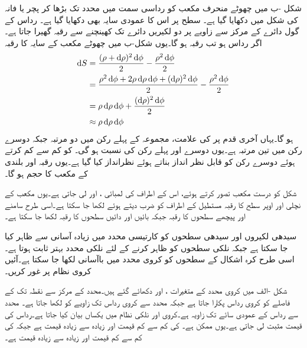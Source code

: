شکل -ب میں چھوٹے منحرف مکعب کو رداسی سمت میں  محدد تک بڑھا کر پچر یا فانہ کی شکل میں دکھایا گیا ہے۔ سطح پر اس کا عمودی سایہ بھی دکھایا گیا ہے۔ رداس کے گول دائرے  کے مرکز سے   زاویے پر دو لکیریں دائرے تک کھینچنے سے   رقبہ گھیرا جاتا ہے۔اگر رداس  ہو تب رقبہ  ہو گا۔یوں شکل-ب میں چھوٹے مکعب کے سایہ  کا رقبہ 
\begin{align*}
\dif S&=\frac{(\rho+\dif \rho)^2 \dif \phi}{2} - \frac{\rho^2 \dif \phi}{2}\\
&=\frac{\rho^2 \dif \phi +2 \rho \dif \rho \dif \phi+(\dif \rho)^2 \dif \phi}{2}-\frac{\rho^2 \dif \phi}{2}\\
&=\rho \dif \rho \dif \phi+\frac{(\dif \rho)^2 \dif \phi}{2}\\
&\approx \rho \dif \rho \dif \phi
\end{align*}
ہو گا۔یہاں آخری قدم پر  کی علامت، مجموعہ کے پہلے رکن میں دو مرتبہ  جبکہ دوسرے رکن میں تین مرتبہ ہے۔یوں دوسرے اور پہلے رکن کی نسبت
   ہو گی۔ کو کم سے کم کرتے ہوئے دوسرے رکن کو قابل نظر انداز بناتے ہوئے نظرانداز کیا گیا ہے۔یوں  رقبہ اور  بلندی کے مکعب کا حجم  ہو گا۔

شکل  کو درست مکعب تصور کرتے ہوئے، اس کے اطراف کی لمبائی ،  اور  لی جاتی ہے۔یوں مکعب کے نچلی اور اوپر سطح کا رقبہ مستطیل کے اطراف کو ضرب دیتے ہوئے   لکھا جا سکتا ہے۔اسی طرح سامنے اور پیچھے سطحوں  کا رقبہ  جبکہ بائیں اور دائیں سطحوں کا رقبہ  لکھا جا سکتا ہے۔

سیدھی لکیروں اور سیدھی سطحوں کو کارتیسی محدد میں زیادہ آسانی سے ظاہر کیا جا سکتا ہے جبکہ نلکی سطحوں کو ظاہر کرنے کے لئے نلکی محدد بہتر ثابت ہوتا ہے۔اسی طرح کرہ اشکال کے سطحوں کو کروی محدد میں باآسانی لکھا جا سکتا ہے۔آئیں کروی نظام پر غور کریں۔

شکل -الف میں کروی محدد کے متغیرات ،  اور  دکھائے گئے ہیں۔محدد کے مرکز سے نقطہ  تک کے فاصلے  کو کروی رداس پکارا جاتا ہے جبکہ  محدد سے کروی رداس تک زاویے کو  لکھا جاتا ہے۔ محدد سے رداس کے عمودی سائے تک زاویہ  ہے۔کروی اور نلکی نظام میں  یکساں بیان کیا جاتا ہے۔رداس کی  قیمت مثبت لی جاتی ہے۔یوں  ممکن ہے۔ کی کم سے کم قیمت  اور  زیادہ سے زیادہ  قیمت  ہے جبکہ  کی کم سے کم قیمت  اور زیادہ سے زیادہ قیمت  ہے۔

